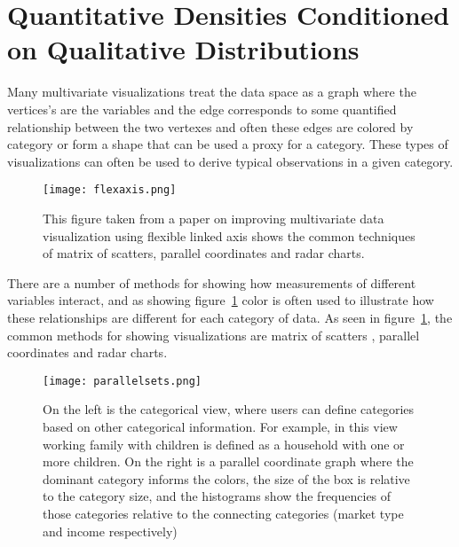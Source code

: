 \documentclass[../main.text]{subfiles}
\begin{document}
\section{Quantitative Densities Conditioned on Qualitative Distributions}



Many multivariate visualizations treat the data space as a graph where the vertices's are the variables and the edge corresponds to some quantified relationship between the two vertexes and often these edges are colored by category or form a shape that can be used a proxy for a category. These types of visualizations can often be used to derive typical observations in a given category.


\begin{figure}
  \texttt{[image: flexaxis.png]}
  \caption{This figure taken from a paper on improving multivariate data visualization using flexible linked axis \cite{claessen_flexible_2011} shows the common techniques of matrix of scatters, parallel coordinates and radar charts.}
  \label{fig:flexlink}
\end{figure}

There are a number of methods for showing how measurements of different
variables interact, and as showing figure~\ref{fig:flexlink} color is often
used to illustrate how these relationships are different for each category of
data. As seen in figure~\ref{fig:flexlink}, the common methods for showing
visualizations are matrix of scatters \cite{elmqvist_rolling_2008} , parallel
coordinates \cite{inselberg_plane_1985, wegman_hyperdimensional_1990} and radar charts\cite{chambers_graphical_1983}.

\begin{figure}
  \texttt{[image: parallelsets.png]}
  \caption{On the left is the categorical view, where users can define
    categories based on other categorical information. For example, in this
    view working family with children is defined as a household with one or
    more children. On the right is a parallel coordinate graph where the
    dominant category informs the colors, the size of the box is relative to
    the category size, and the histograms show the frequencies of those
    categories relative to the connecting categories (market type and income
    respectively)}
  \label{fig:parallelsets}
\end{figure}
\end{document}
